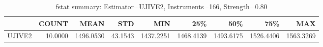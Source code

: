 \begin{table}[ht]
\centering
\caption{fstat summary: Estimator=UJIVE2, Instruments=166, Strength=0.80}
\begin{tabular}{lrrrrrrrr}
\toprule
 & COUNT & MEAN & STD & MIN & 25\% & 50\% & 75\% & MAX \\
\midrule
UJIVE2 & 10.0000 & 1496.0530 & 43.1543 & 1437.2251 & 1468.4139 & 1493.6175 & 1526.4406 & 1563.3269 \\
\bottomrule
\end{tabular}
\end{table}
